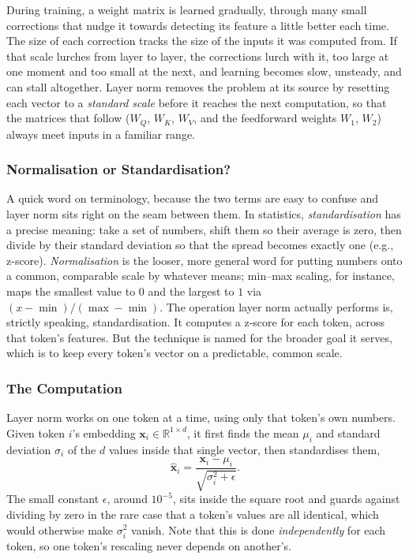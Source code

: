 \documentclass[11pt]{article}
\begin{document}
During training, a weight matrix is learned gradually, through many small corrections that nudge it towards detecting its feature a little better each time. The size of each correction tracks the size of the inputs it was computed from. If that scale lurches from layer to layer, the corrections lurch with it, too large at one moment and too small at the next, and learning becomes slow, unsteady, and can stall altogether. Layer norm removes the problem at its source by resetting each vector to a \textit{standard scale} before it reaches the next computation, so that the matrices that follow ($W_Q$, $W_K$, $W_V$, and the feedforward weights $W_1$, $W_2$) always meet inputs in a familiar range.

\subsubsection*{Normalisation or Standardisation?}

A quick word on terminology, because the two terms are easy to confuse and layer norm sits right on the seam between them. In statistics, \textit{standardisation} has a precise meaning: take a set of numbers, shift them so their average is zero, then divide by their standard deviation so that the spread becomes exactly one (e.g., z-score). \textit{Normalisation} is the looser, more general word for putting numbers onto a common, comparable scale by whatever means; min–max scaling, for instance, maps the smallest value to $0$ and the largest to $1$ via $(x-\min)/(\max-\min)$. The operation layer norm actually performs is, strictly speaking, standardisation. It computes a z-score for each token, across that token's features. But the technique is named for the broader goal it serves, which is to keep every token's vector on a predictable, common scale.

\subsubsection*{The Computation}

Layer norm works on one token at a time, using only that token's own numbers. Given token $i$'s embedding $\mathbf{x}_i \in \mathbb{R}^{1 \times d}$, it first finds the mean $\mu_i$ and standard deviation $\sigma_i$ of the $d$ values inside that single vector, then standardises them,
\[
\hat{\mathbf{x}}_i = \frac{\mathbf{x}_i - \mu_i}{\sqrt{\sigma_i^2 + \epsilon}}.
\]
The small constant $\epsilon$, around $10^{-5}$, sits inside the square root and guards against dividing by zero in the rare case that a token's values are all identical, which would otherwise make $\sigma_i^2$ vanish. Note that this is done \textit{independently} for each token, so one token's rescaling never depends on another's.
\end{document}
